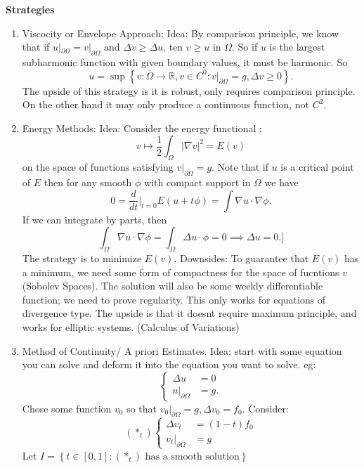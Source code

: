 \documentclass[12pt, a4paper]{article}
\theoremstyle{definition}
\newcommand{\R}{\mathbb{R}}                           %
\newcommand{\bd}{\partial}
\newcommand{\grad}{\nabla}
\newcommand{\ol}{\overline}
\begin{document}
\begin{tcolorbox}[breakable, colback = white]
	\textbf{Strategies}
\begin{enumerate}[label = \roman*)]
	\item Viscocity or Envelope Approach:
		\newline Idea: By comparison principle, we know that if $u|_{\bd \Omega} = v|_{\bd \Omega}$ and $\Delta v \geq \Delta u$, ten $v \geq u$ in $\Omega$. So if $u$ is the largest subharmonic function with given boundary values, it must be harmonic. 
		So
		$$ u = \sup \left\{ v: \ol{\Omega} \to \R ,v\in C^0 : v|_{\bd \Omega} = g, \Delta v \geq 0 \right\}. $$
		The upside of this strategy is it is robust, only requires comparison principle. On the other hand it may only produce a continuous function, not $C^2$. 
	\item Energy Methods: 
		\newline Idea: Consider the energy functional :
		$$ v \mapsto \frac{ 1 }{ 2 } \int_{\Omega} \left| \grad v \right|^2  = E(v) $$
		on the space of functions satisfying $v|_{\bd \Omega} = g$. Note that if $u$ is a critical point of $E$ then for any smooth $\phi$ with compact support in $\Omega$ we have
		$$ 0 = \frac{ d }{ dt } \Big|_{t = 0} E(u + t\phi) = \int \grad u \cdot \grad \phi. $$ If we can integrate by parts, then 
		$$ \int_\Omega \grad u \cdot \grad \phi = \int_\Omega \Delta u \cdot \phi = 0 \implies  \Delta u = 0.]
	$$ 
		The strategy is to minimize $E(v)$. Downsides: 
		To guarantee that $E(v)$ has a minimum, we need some form of compactness for the space of fucntions $v$ (Sobolev Spaces). The solution will also be some weekly differentiable function; we need to prove regularity. This only works for equations of divergence type. The upside is that it doesnt require maximum principle, and works for elliptic systems. (Calculus of Variations)
	\item Method of Continuity/ A priori Estimates. 
Idea: start with some equation you can solve and deform it into  the equation you want to solve. eg:
$$ \begin{cases}
	\Delta u & = 0
	\\ u|_{\bd \Omega} & = g.
\end{cases} $$ 
		Chose some function $v_0$ so that $v_0|_{\bd \Omega} = g, \Delta v_0 = f_0$. 
		Consider:
		$$ (*_t) \begin{cases}
			\Delta v_t & = (1-t)f_0
			\\ v_t |_{\bd \Omega} &= g
		\end{cases} $$ 
		Let $I = \left\{ t \in [0,1] : (*_t) \text{ has a smooth solution} \right\}	$


\end{enumerate}
\end{tcolorbox}
\end{document}
